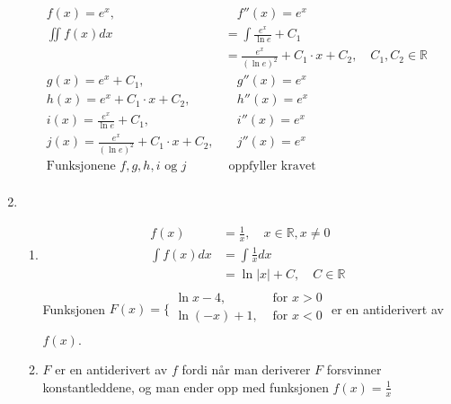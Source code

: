 \documentclass[a4paper, 12pt]{article}  %
\begin{document}
\begin{enumerate}
          \begin{align*}
              f(x) = e^x,                                                     & \quad f''(x) = e^x                                                         \\
              \iint{f(x)}dx                                                   & = \int{\frac{e^x}{\ln e}+C_1}                                              \\
                                                                              & = {\frac{e^x}{(\ln e)^2}+C_1 \cdot x + C_2}, \quad C_1, C_2 \in \mathbb{R} \\
              g(x) = e^x + C_1,                                               & \quad g''(x) = e^x                                                         \\
              h(x) = e^x + C_1 \cdot x + C_2,                                 & \quad h''(x) = e^x                                                         \\
              i(x) = {\frac{e^x}{\ln e}+C_1},                                 & \quad i''(x) = e^x                                                         \\
              j(x) = {\frac{e^x}{(\ln e)^2}+C_1 \cdot x + C_2},               & \quad j''(x) = e^x                                                         \\
              \text{Funksjonene } f, g, h, i                    \text{ og } j & \text{ oppfyller kravet}                                                   \\
          \end{align*}
    \item [\boxed{4}]
          \begin{enumerate}
              \item
                    \begin{align*}
                        f(x)         & = \frac{1}{x}, \quad x \in \mathbb{R}, x \neq 0 \\
                        \int{f(x)}dx & = \int{\frac{1}{x}}dx                           \\
                                     & = \ln |x| + C, \quad C \in \mathbb{R}           \\
                    \end{align*}
                    Funksjonen \(F(x) = \biggl\{\begin{array}{ll}
                        \ln x - 4,    & \text{ for } x > 0 \\
                        \ln (-x) + 1, & \text{ for } x < 0 \\
                    \end{array}\) er en antiderivert av \(f(x)\).
              \item \(F\) er en antiderivert av \(f\) fordi når man deriverer \(F\) forsvinner konstantleddene, og man ender opp med funksjonen \(f(x) = \frac{1}{x}\)
          \end{enumerate}
\end{enumerate}

\end{document}
